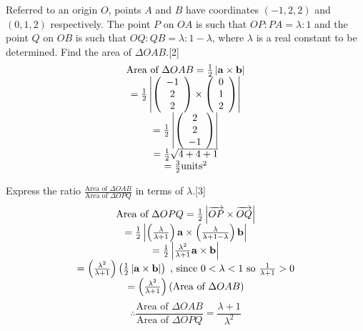 \documentclass[12pt, a4 paper]{article}
\begin{document}
\begin{outline}[enumerate]
					\color{black}
					\1 Referred to an origin $O$, points $A$ and $B$ have coordinates $(-1,2,2)$ and $(0,1,2)$ respectively. The point $P$ on $OA$ is such that $OP:PA = \lambda :1$ and the point $Q$ on $OB$ is such that $OQ:QB = \lambda :1 - \lambda $, where $\lambda $ is a real constant to be determined.
					\2 Find the area of $\Delta OAB$.\hfill[2]
					\color{blue}
					\[\begin{array}{c}{\textrm{Area of }}\Delta OAB = \frac{1}{2}\left| {{\bf{a}} \times {\bf{b}}} \right|\\ = \frac{1}{2}\left| {\left( {\begin{array}{*{20}{c}}{ - 1}\\2\\2\end{array}} \right) \times \left( {\begin{array}{*{20}{c}}0\\1\\2\end{array}} \right)} \right|\\ = \frac{1}{2}\left| {\left( {\begin{array}{*{20}{c}}2\\2\\{ - 1}\end{array}} \right)} \right|\\ = \frac{1}{2}\sqrt {4 + 4 + 1} \\ = \frac{3}{2}{\textrm{unit}}{{\textrm{s}}^2}\end{array}\]

					\color{black}
					\2 Express the ratio $\frac{{{\textrm{Area of }}\Delta OAB}}{{{\textrm{Area of }}\Delta OPQ}}$ in terms of $\lambda $.\hfill[3]
					\color{blue}
					\[\begin{array}{c}{\textrm{Area of }}\Delta OPQ = \frac{1}{2}\left| {\overrightarrow {OP}  \times \overrightarrow {OQ} } \right|\\ = \frac{1}{2}\left| {\left( {\frac{\lambda }{{\lambda  + 1}}} \right){\bf{a}} \times \left( {\frac{\lambda }{{\lambda  + 1 - \lambda }}} \right){\bf{b}}} \right|\\ = \frac{1}{2}\left| {\frac{{{\lambda ^2}}}{{\lambda  + 1}}{\bf{a}} \times {\bf{b}}} \right|\\ = \left( {\frac{{{\lambda ^2}}}{{\lambda  + 1}}} \right)\left( {\frac{1}{2}\left| {{\bf{a}} \times {\bf{b}}} \right|} \right)\;{\textrm{, since }}0 < \lambda  < 1{\textrm{ so }}\frac{1}{{\lambda  + 1}} > 0\\ = \left( {\frac{{{\lambda ^2}}}{{\lambda  + 1}}} \right)\left( {{\textrm{Area of }}\Delta OAB} \right)\end{array}\]
					\[\therefore \frac{{{\textrm{Area of }}\Delta OAB}}{{{\textrm{Area of }}\Delta OPQ}} = \frac{{\lambda  + 1}}{{{\lambda ^2}}}\]



\end{outline}
\end{document}
